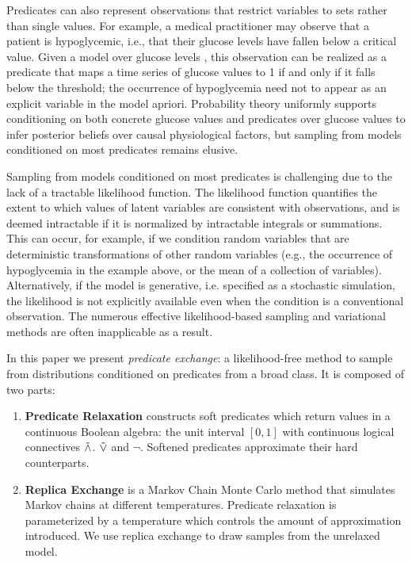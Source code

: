 Predicates can also represent observations that restrict variables to sets rather than single values.
For example, a medical practitioner may observe that a patient is hypoglycemic, i.e., that their glucose levels have fallen below a critical value.
Given a model over glucose levels \citep{levine2017offline,murata2004probabilistic}, this observation can be realized as a predicate that maps a time series of glucose values to 1 if and only if it falls below the threshold; the occurrence of hypoglycemia need not to appear as an explicit variable in the model apriori.
Probability theory uniformly supports conditioning on both concrete glucose values and predicates over glucose values to infer posterior beliefs over causal physiological factors,  but sampling from models conditioned on most predicates remains elusive. 

Sampling from models conditioned on most predicates is challenging due to the lack of a tractable likelihood function.
The likelihood function quantifies the extent to which values of latent variables are consistent with observations, and is deemed intractable if it is normalized by intractable integrals or summations.
This can occur, for example, if we condition random variables that are deterministic transformations of other random variables (e.g., the occurrence of hypoglycemia in the example above, or the mean of a collection of variables).	
Alternatively, if the model is generative, i.e. specified as a stochastic simulation, the likelihood is not explicitly available even when the condition is a conventional observation.
The numerous effective likelihood-based sampling \citep{andrieu2003introduction} and variational  \citep{jordan1999introduction, ranganath2014black} methods are often inapplicable as a result.


In this paper we present \emph{predicate exchange}:
a likelihood-free method to sample from distributions conditioned on predicates from a broad class.
It is composed of two parts:
\begin{enumerate}
\item \textbf{Predicate Relaxation} constructs soft predicates which return values in a continuous Boolean algebra: the unit interval $[0, 1]$ with continuous logical connectives $\mathrel{\tilde{\land}}$. $\mathrel{\tilde{\lor}}$ and $\neg$.  Softened predicates approximate their hard counterparts.
\item  \textbf{Replica Exchange} is a Markov Chain Monte Carlo method that simulates Markov chains at different temperatures.  Predicate relaxation is parameterized by a temperature which controls the amount of approximation introduced.  We use replica exchange to draw samples from the unrelaxed model. 
\end{enumerate}

